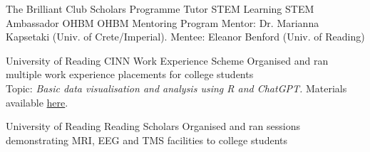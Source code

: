 {The Brilliant Club}
{Scholars Programme Tutor}
{}
{STEM Learning}
{STEM Ambassador}
{}
{OHBM}
{OHBM Mentoring Program}
{Mentor: Dr. Marianna Kapsetaki (Univ. of Crete/Imperial). Mentee: Eleanor Benford (Univ. of Reading)}

{University of Reading}
{CINN Work Experience Scheme}
{Organised and ran multiple work experience placements for college students \\Topic: \emph{Basic data visualisation and analysis using R and ChatGPT.} Materials available \href{https://github.com/sohaamir/haven_work_exp}{here}.}

{University of Reading}
{Reading Scholars}
{Organised and ran sessions demonstrating MRI, EEG and TMS facilities to college students}
